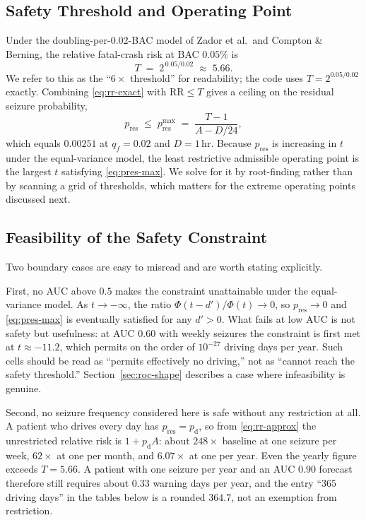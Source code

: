\documentclass[11pt]{article}
\numberwithin{equation}{section}
\newcommand{\pd}{p_{\mathrm{d}}}
\newcommand{\pres}{p_{\mathrm{res}}}
\begin{document}
\subsection{Safety Threshold and Operating Point}
\label{sec:threshold}

Under the doubling-per-$0.02$-BAC model of Zador et al.\ and Compton \& Berning, the
relative fatal-crash risk at BAC $0.05\%$ is
\begin{equation}
T \;=\; 2^{\,0.05/0.02} \;\approx\; 5.66.
\label{eq:threshold}
\end{equation}
We refer to this as the ``$6\times$ threshold'' for readability; the code uses
$T = 2^{0.05/0.02}$ exactly. Combining \eqref{eq:rr-exact} with $\mathrm{RR} \le T$
gives a ceiling on the residual seizure probability,
\begin{equation}
\pres \;\le\; \pres^{\max} \;=\; \frac{T - 1}{A - D/24},
\label{eq:pres-max}
\end{equation}
which equals $0.00251$ at $q_f = 0.02$ and $D = 1$\,hr. Because $\pres$ is increasing in
$t$ under the equal-variance model, the least restrictive admissible operating point is
the largest $t$ satisfying \eqref{eq:pres-max}. We solve for it by root-finding rather
than by scanning a grid of thresholds, which matters for the extreme operating points
discussed next.

\subsection{Feasibility of the Safety Constraint}
\label{sec:feasibility}

Two boundary cases are easy to misread and are worth stating explicitly.

First, no AUC above $0.5$ makes the constraint unattainable under the equal-variance
model. As $t \to -\infty$, the ratio $\Phi(t - d')/\Phi(t) \to 0$, so $\pres \to 0$ and
\eqref{eq:pres-max} is eventually satisfied for any $d' > 0$. What fails at low AUC is
not safety but usefulness: at AUC $0.60$ with weekly seizures the constraint is first
met at $t \approx -11.2$, which permits on the order of $10^{-27}$ driving days per
year. Such cells should be read as ``permits effectively no driving,'' not as ``cannot
reach the safety threshold.'' Section~\ref{sec:roc-shape} describes a case where
infeasibility is genuine.

Second, no seizure frequency considered here is safe without any restriction at all.
A patient who drives every day has $\pres = \pd$, so from \eqref{eq:rr-approx} the
unrestricted relative risk is $1 + \pd A$: about $248\times$ baseline at one seizure per
week, $62\times$ at one per month, and $6.07\times$ at one per year. Even the yearly
figure exceeds $T = 5.66$. A patient with one seizure per year and an AUC $0.90$
forecast therefore still requires about $0.33$ warning days per year, and the entry
``$365$ driving days'' in the tables below is a rounded $364.7$, not an exemption from
restriction.
\end{document}
